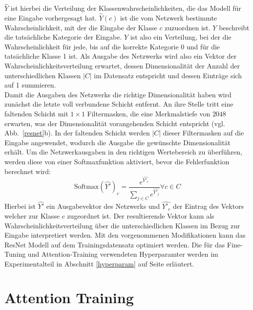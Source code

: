 $\hat{Y}$ ist hierbei die Verteilung der Klassenwahrscheinlichkeiten, die das Modell für eine Eingabe vorhergesagt hat. $\hat{Y}(c)$ ist die vom Netzwerk bestimmte Wahrscheinlichkeit, mit der die Eingabe der Klasse $c$ zuzuordnen ist. $Y$ beschreibt die tatsächliche Kategorie der Eingabe. $Y$ ist also ein Verteilung, bei der die Wahrscheinlichkeit für jede, bis auf die korrekte Kategorie 0 und für die tatsächliche Klasse 1 ist. Als Ausgabe des Netzwerks wird also ein Vektor der Wahrscheinlichkeitsverteilung erwartet, dessen Dimensionalität der Anzahl der unterschiedlichen Klassen $|C|$ im Datensatz entspricht und dessen Einträge sich auf 1 summieren. \\
Damit die Ausgaben des Netzwerks die richtige Dimensionalität haben wird zunächst die letzte voll verbundene Schicht entfernt. An ihre Stelle tritt eine faltenden Schicht mit $1\times1$ Filtermasken, die eine Merkmalstiefe von $2048$ erwarten, was der Dimensionalität vorangehenden Schicht entspricht (vgl. Abb.~\ref{resnet}b). In der faltenden Schicht werden $|C|$ dieser Filtermasken auf die Eingabe angewendet, wodurch die Ausgabe die gewünschte Dimensionalität erhält.
Um die Netzwerkausgaben in den richtigen Wertebereich zu überführen, werden diese von einer Softmaxfunktion aktiviert, bevor die Fehlerfunktion berechnet wird:
\begin{equation}
\text{Softmax}(\hat{Y'})_{c} = \frac{e^{\hat{Y'_c}}}{\sum_{ j \in C}{e^{\hat{Y'_j}}}} \forall c \in C
\end{equation}
Hierbei ist $\hat{Y'}$ ein Ausgabevektor des Netzwerks und $\hat{Y'_c}$ der Eintrag des Vektors welcher zur Klasse $c$ zugeordnet ist. Der resultierende Vektor kann als Wahrscheinlichkeitsverteilung über die unterschiedlichen Klassen im Bezug zur Eingabe interpretiert werden. Mit den vorgenommenen Modifikationen kann das ResNet Modell auf dem Trainingsdatensatz optimiert werden. Die für das Fine-Tuning und Attention-Training verwendeten Hyperparamter werden im Experimentalteil in Abschnitt \ref{hyperparam} auf Seite \pageref{hyperparam} erläutert.

\section{Attention Training}


